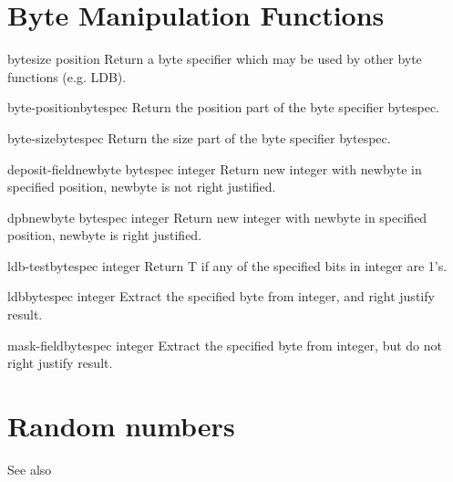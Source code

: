 \section{Byte Manipulation Functions}
\label{sec:byte-manip-funct}

\begin{function}{byte}{size position}{}{}
  Return a byte specifier which may be used by other byte functions
  (e.g. LDB).
\end{function}

\begin{function}{byte-position}{bytespec}{}{}
  Return the position part of the byte specifier bytespec.
\end{function}

\begin{function}{byte-size}{bytespec}{}{}
  Return the size part of the byte specifier bytespec.
\end{function}

\begin{function}{deposit-field}{newbyte bytespec integer}{}{}
  Return new integer with newbyte in specified position, newbyte is not right justified.
\end{function}

\begin{function}{dpb}{newbyte bytespec integer}{}{}
  Return new integer with newbyte in specified position, newbyte is right justified.
\end{function}

\begin{function}{ldb-test}{bytespec integer}{}{}
  Return T if any of the specified bits in integer are 1's.
\end{function}

\begin{accessor}{ldb}{bytespec integer}{}{}
  Extract the specified byte from integer, and right justify result.
\end{accessor}

\begin{accessor}{mask-field}{bytespec integer}{}{}
  Extract the specified byte from integer,  but do not right justify result.
\end{accessor}

\section{Random numbers}
\label{sec:random-numbers}

See also 

